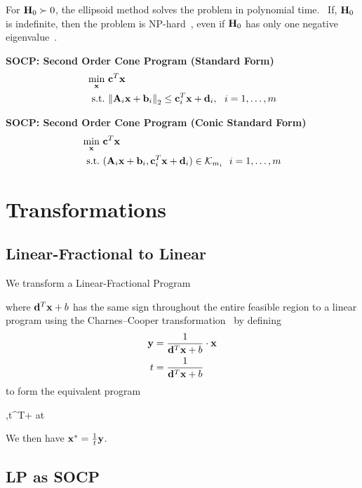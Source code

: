 For $\mathbf{H}_0\succ 0$, the ellipsoid method solves the problem in polynomial time.~\citep{Kozlov1980} If, $\mathbf{H}_0$ is indefinite, then the problem is NP-hard~\citep{Sahni1974}, even if $\mathbf{H}_0$ has only one negative eigenvalue~\citep{Pardalos1991}.

\textbf{SOCP: Second Order Cone Program (Standard Form)}
\begin{align}
\min_{\mathbf{x}}      ~& \mathbf{c}^T \mathbf{x} \\
\textrm{s.t.}   ~& \norm{\mathbf{A}_i \mathbf{x}+\mathbf{b}_i}_2\le \mathbf{c}_i^T \mathbf{x}+\mathbf{d}_i,~~i=1,\ldots,m
\end{align}

\textbf{SOCP: Second Order Cone Program (Conic Standard Form)}
\begin{align}
\min_{\mathbf{x}}      ~& \mathbf{c}^T \mathbf{x} \\
\textrm{s.t.}   ~& (\mathbf{A}_i \mathbf{x}+\mathbf{b}_i, \mathbf{c}_i^T \mathbf{x}+\mathbf{d}_i)\in\mathcal{K}_{m_i} ~~i=1,\ldots,m
\end{align}

\section{Transformations}

\subsection{Linear-Fractional to Linear}
We transform a Linear-Fractional Program
\begin{maxi!}{\vx}{}{}{}
\addConstraint{\mA\vx}{\le \vb}
\end{maxi!}
where $\mathbf{d}^T \mathbf{x} + b$ has the same sign throughout the entire feasible region to a linear program using the Charnes--Cooper transformation~\citep{Charnes1962} by defining
\begin{align}
\mathbf{y} &= \frac{1}{\mathbf{d}^T\mathbf{x}+b}\cdot\mathbf{x} \\
t   &= \frac{1}{\mathbf{d}^T\mathbf{x}+b}
\end{align}
to form the equivalent program
\begin{maxi!}{\vy,t}{\vc^T\vy + at}{}{}
\end{maxi!}
We then have $\mathbf{x}^*=\frac{1}{t}\mathbf{y}$.

\subsection{LP as SOCP}

